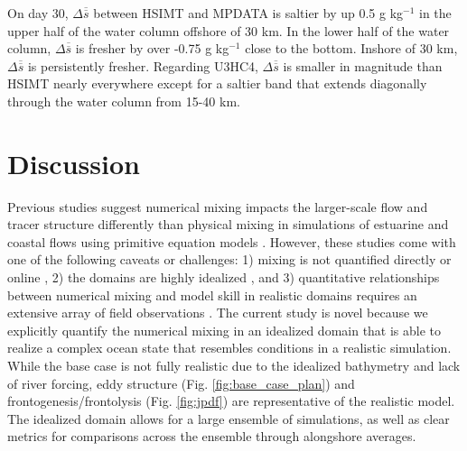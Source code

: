 On day 30, $\Delta\overline{\overline{s}}$ between HSIMT and MPDATA is saltier by up 0.5 g kg$^{-1}$ in the upper half of the water column offshore of 30 km. In the lower half of the water column, $\Delta\overline{\overline{s}}$ is fresher by over -0.75 g kg$^{-1}$ close to the bottom. Inshore of 30 km, $\Delta \overline{\overline{s}}$ is persistently fresher. Regarding U3HC4, $\Delta \overline{\overline{s}}$ is smaller in magnitude than HSIMT nearly everywhere except for a saltier band that extends diagonally through the water column from 15-40 km.

\section{Discussion} \label{sec:discussion}

Previous studies suggest numerical mixing impacts the larger-scale flow and tracer structure differently than physical mixing in simulations of estuarine and coastal flows using primitive equation models \citep{fofonova2021plume, Kalra_2019, karna2016evaluation, Ralston_2017}. However, these studies come with one of the following caveats or challenges: 1) mixing is not quantified directly or online \citep{fofonova2021plume, karna2016evaluation}, 2) the domains are highly idealized \citep{fofonova2021plume, Kalra_2019}, and 3) quantitative relationships between numerical mixing and model skill in realistic domains requires an extensive array of field observations \citep{karna2016evaluation, Ralston_2017}. The current study is novel because we explicitly quantify the numerical mixing in an idealized domain that is able to realize a complex ocean state that resembles conditions in a realistic simulation. While the base case is not fully realistic due to the idealized bathymetry and lack of river forcing, eddy structure (Fig. \ref{fig:base_case_plan}) and frontogenesis/frontolysis (Fig. \ref{fig:jpdf}) are representative of the realistic model. The idealized domain allows for a large ensemble of simulations, as well as clear metrics for comparisons across the ensemble through alongshore averages.

